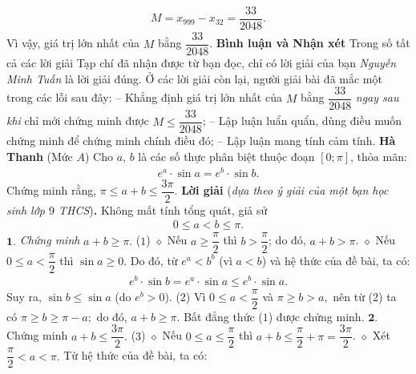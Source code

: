 \begin{multicols}{2}
\begin{align*}
		M = {x_{999}} - {x_{32}} = \dfrac{{33}}{{2048}}.
	\end{align*}
	Vì vậy, giá trị lớn nhất của $M$ bằng  $\dfrac{{33}}{{2048}}$.
	\vskip 0.05cm
	\textbf{\color{thachthuctoanhoc}Bình luận và Nhận xét}
	\vskip 0.05cm
	Trong số tất cả các lời giải Tạp chí đã nhận được từ bạn đọc, chỉ có lời giải của bạn \textit{Nguyễn Minh Tuấn} là lời giải đúng. Ở các lời giải còn lại, người giải bài đã mắc một trong các lỗi sau đây:
	\vskip 0.05cm
	-- Khẳng định giá trị lớn nhất của $M$ bằng $\dfrac{33}{2048}$  \textit{ngay sau khi} chỉ mới chứng minh được  $M \le \dfrac{{33}}{{2048}}$;
	\vskip 0.05cm
	-- Lập luận luẩn quẩn, dùng điều muốn chứng minh để chứng minh chính điều đó;
	\vskip 0.05cm
	-- Lập luận mang tính cảm tính.
	\vskip 0.1cm
	\hfill\textbf{\color{thachthuctoanhoc}Hà Thanh}
	\vskip 0.1cm
	{}
	(Mức $A$)
	Cho $a$, $b$ là các số thực phân biệt thuộc đoạn $[0; \pi]$, thỏa mãn: 
	\begin{align*}
		{e^a} \cdot \sin a = {e^b} \cdot \sin b. 
	\end{align*} 
	Chứng minh rằng,  $\pi  \le a + b \le \dfrac{{3\pi }}{2}.$ 
	\vskip 0.05cm
	\textbf{\color{thachthuctoanhoc}Lời giải} (\textit{dựa theo ý giải của một bạn học sinh lớp $9$ THCS})\textbf{\color{thachthuctoanhoc}.}
	\vskip 0.05cm
	Không mất tính tổng quát, giả sử  
	\begin{align*}
		0 \le a < b \le \pi .
	\end{align*}
	$\pmb{1.}$ \textit{Chứng minh} $a + b \ge \pi.$ \hfill ($1$)
	\vskip 0.05cm 
	$\diamond$ Nếu $a \ge \dfrac{\pi}{2}$  thì $b > \dfrac{\pi}{2}$;  do đó, $a + b > \pi$.
	\vskip 0.05cm 
	$\diamond$ Nếu $0 \le a < \dfrac{\pi}{2}$ thì $\sin a \ge 0$. Do đó, từ $e^a < b^b$  (vì $a < b$) và hệ thức của đề bài, ta có:
	\begin{align*}
		{e^b} \cdot \sin b = {e^a} \cdot \sin a \le {e^b} \cdot \sin a.
	\end{align*}
	Suy ra, $\sin b \le \sin a$ (do $e^b > 0$). \hfill ($2$)
	\vskip 0.05cm
	Vì $0 \le a < \dfrac{\pi }{2}$  và $\pi  \ge b > a,$  nên từ ($2$) ta có $\pi  \ge b \ge \pi  - a;$   do đó, $a+b \ge \pi$.
	\vskip 0.05cm 
	Bất đẳng thức ($1$) được chứng minh.
	\vskip 0.05cm
	$\pmb{2.}$ Chứng minh $a + b \le \dfrac{{3\pi }}{2}.$ \hfill ($3$)
	\vskip 0.05cm
	$\diamond$ Nếu  $0 \le a \le \dfrac{\pi }{2}$ thì $a + b \le \dfrac{\pi }{2} + \pi  = \dfrac{{3\pi }}{2}$.
	\vskip 0.05cm   
	$\diamond$ Xét $\dfrac{\pi }{2} < a < \pi .$
	\vskip 0.05cm 
	Từ hệ thức của đề bài, ta có:
	\begin{align*}

\end{align*}
\end{multicols}
